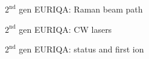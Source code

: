 \documentclass{beamer}
\begin{document}

\begin{frame}{$2^{\text{nd}}$ gen EURIQA: Raman beam path}
  \begin{center}
    \begin{tikzpicture}
    \end{tikzpicture}
  \end{center}
\end{frame}



\begin{frame}{$2^{\text{nd}}$ gen EURIQA: CW lasers}
  \begin{center}
    \begin{tikzpicture}
    \end{tikzpicture}
  \end{center}
\end{frame}



\begin{frame}{$2^{\text{nd}}$ gen EURIQA: status and first ion}
  \begin{center}
    \begin{tikzpicture}
    \end{tikzpicture}
  \end{center}
\end{frame}

\begin{frame}{}
\end{frame}
\end{document}
